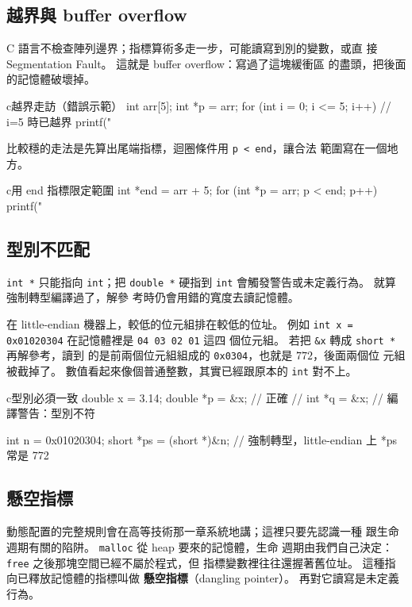 \subsection{越界與 buffer overflow}

C 語言不檢查陣列邊界；指標算術多走一步，可能讀寫到別的變數，或直
接 Segmentation Fault。 這就是 buffer overflow：寫過了這塊緩衝區
的盡頭，把後面的記憶體破壞掉。

\begin{code}{c}{越界走訪（錯誤示範）}
int arr[5];
int *p = arr;
for (int i = 0; i <= 5; i++) {   // i=5 時已越界
    printf("%
}
\end{code}

比較穩的走法是先算出尾端指標，迴圈條件用 \texttt{p < end}，讓合法
範圍寫在一個地方。

\begin{code}{c}{用 end 指標限定範圍}
int *end = arr + 5;
for (int *p = arr; p < end; p++) {
    printf("%
}
\end{code}

\subsection{型別不匹配}

\texttt{int *} 只能指向 \texttt{int}；把 \texttt{double *} 硬指到
\texttt{int} 會觸發警告或未定義行為。 就算強制轉型編譯過了，解參
考時仍會用錯的寬度去讀記憶體。

在 little-endian 機器上，較低的位元組排在較低的位址。 例如
\texttt{int x = 0x01020304} 在記憶體裡是 \texttt{04 03 02 01} 這四
個位元組。 若把 \texttt{\&x} 轉成 \texttt{short *} 再解參考，讀到
的是前兩個位元組組成的 \texttt{0x0304}，也就是 $772$，後面兩個位
元組被截掉了。 數值看起來像個普通整數，其實已經跟原本的
\texttt{int} 對不上。

\begin{code}{c}{型別必須一致}
double x = 3.14;
double *p = &x;              // 正確
// int *q = &x;              // 編譯警告：型別不符

int n = 0x01020304;
short *ps = (short *)&n;     // 強制轉型，little-endian 上 *ps 常是 772
\end{code}

\subsection{懸空指標}

動態配置的完整規則會在高等技術那一章系統地講；這裡只要先認識一種
跟生命週期有關的陷阱。 \texttt{malloc} 從 heap 要來的記憶體，生命
週期由我們自己決定：\texttt{free} 之後那塊空間已經不屬於程式，但
指標變數裡往往還握著舊位址。 這種指向已釋放記憶體的指標叫做
\textbf{懸空指標}（dangling pointer）。 再對它讀寫是未定義行為。

